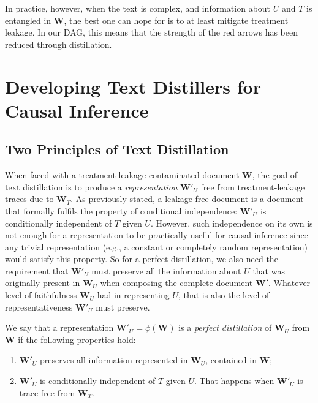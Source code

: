 \documentclass[11pt]{article}
\newcommand{\bW}{\bm{W}}  %
\begin{document}
In practice, however, when the text is complex, and information about $U$ and $T$ is entangled in $\bW$, the best one can hope for is to at least mitigate treatment leakage. In our DAG, this means that the strength of the red arrows has been reduced through distillation.

\section{Developing Text Distillers for Causal Inference}
\label{sec:principles}


\subsection{Two Principles of Text Distillation}
When faced with a treatment-leakage contaminated document $\bW$, the goal of text distillation is to produce a \emph{representation}  $\bm{W'}_U$ free from treatment-leakage traces due to $\bW_T$. As previously stated, a leakage-free document is a document that formally fulfils the property of conditional independence: $\bm{W'}_U$ is conditionally independent of $T$ given $U$. However, such independence on its own is not enough for a representation to be practically useful for causal inference since any trivial representation (e.g., a constant or completely random representation) would satisfy this property. So for a perfect distillation, we also need the requirement that $\bm{W'}_U$ must preserve all the information about $U$ that was originally present in $\bW_U$ when composing the complete document $\bm{W'}$. Whatever level of faithfulness $\bW_U$ had in representing $U$, that is also the level of representativeness $\bm{W'}_U$ must preserve.


We say that a representation $\bm{W'}_U = \phi(\bW)$ is a \emph{perfect distillation} of $\bm{W}_U$ from $\bm{W}$ if the following properties hold:

\begin{enumerate}%
\item $\bm{W'}_U$ preserves all information represented in $\bm{W}_U$, contained in $\bm{W}$;
\item $\bm{W'}_U$ is conditionally independent of $T$ given $U$. That happens when $\bm{W'}_U$ is trace-free from $\bW_T$.
\end{enumerate}
\end{document}
